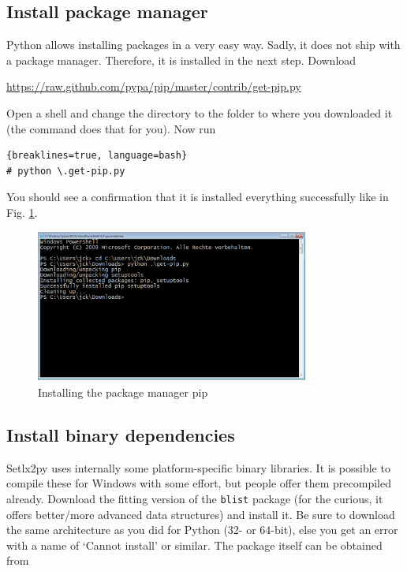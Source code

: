 \subsection{Install package manager}

Python allows installing packages in a very easy way. Sadly, it does not ship with a package manager. Therefore, it is installed in the next step. Download

\url{https://raw.github.com/pypa/pip/master/contrib/get-pip.py}

Open a shell and change the directory to the folder to where you downloaded it (the  command does that for you). Now run 

\begin{lstlisting}{breaklines=true, language=bash}
# python \.get-pip.py
\end{lstlisting}

You should see a confirmation that it is installed everything successfully like in Fig. \ref{fig:install-pip}.

\begin{figure}[ht]
    \centering
    \includegraphics[width=0.8\textwidth]{img/install-pip.png}    
    \caption{Installing the package manager pip}
    \label{fig:install-pip}    
\end{figure}

\subsection{Install binary dependencies}

Setlx2py uses internally some platform-specific binary libraries. It is possible to compile these for Windows with some effort, but people offer them precompiled already. Download the fitting version of the \texttt{blist} package (for the curious, it offers better/more advanced data structures) and install it. Be sure to download the same architecture as you did for Python (32- or 64-bit), else you get an error with a name of `Cannot install' or similar. The package itself can be obtained from

